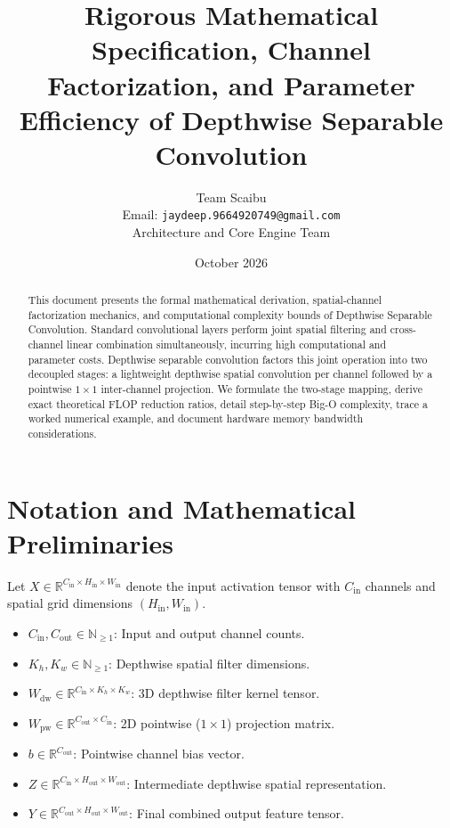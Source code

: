 \documentclass[11pt,a4paper]{article}
\title{\textbf{Rigorous Mathematical Specification, Channel Factorization, and Parameter Efficiency of Depthwise Separable Convolution}}
\author{Team Scaibu \\ \small Email: \texttt{jaydeep.9664920749@gmail.com} \\ \small Architecture and Core Engine Team}
\date{October 2026}
\theoremstyle{definition}
\begin{document}
\maketitle

\begin{abstract}
This document presents the formal mathematical derivation, spatial-channel factorization mechanics, and computational complexity bounds of Depthwise Separable Convolution. Standard convolutional layers perform joint spatial filtering and cross-channel linear combination simultaneously, incurring high computational and parameter costs. Depthwise separable convolution factors this joint operation into two decoupled stages: a lightweight depthwise spatial convolution per channel followed by a pointwise $1 \times 1$ inter-channel projection. We formulate the two-stage mapping, derive exact theoretical FLOP reduction ratios, detail step-by-step Big-O complexity, trace a worked numerical example, and document hardware memory bandwidth considerations.
\end{abstract}

\section{Notation and Mathematical Preliminaries}

Let $X \in \mathbb{R}^{C_{\text{in}} \times H_{\text{in}} \times W_{\text{in}}}$ denote the input activation tensor with $C_{\text{in}}$ channels and spatial grid dimensions $(H_{\text{in}}, W_{\text{in}})$.

\begin{itemize}
    \item $C_{\text{in}}, C_{\text{out}} \in \mathbb{N}_{\ge 1}$: Input and output channel counts.
    \item $K_h, K_w \in \mathbb{N}_{\ge 1}$: Depthwise spatial filter dimensions.
    \item $W_{\text{dw}} \in \mathbb{R}^{C_{\text{in}} \times K_h \times K_w}$: 3D depthwise filter kernel tensor.
    \item $W_{\text{pw}} \in \mathbb{R}^{C_{\text{out}} \times C_{\text{in}}}$: 2D pointwise ($1 \times 1$) projection matrix.
    \item $b \in \mathbb{R}^{C_{\text{out}}}$: Pointwise channel bias vector.
    \item $Z \in \mathbb{R}^{C_{\text{in}} \times H_{\text{out}} \times W_{\text{out}}}$: Intermediate depthwise spatial representation.
    \item $Y \in \mathbb{R}^{C_{\text{out}} \times H_{\text{out}} \times W_{\text{out}}}$: Final combined output feature tensor.
\end{itemize}
\end{document}
